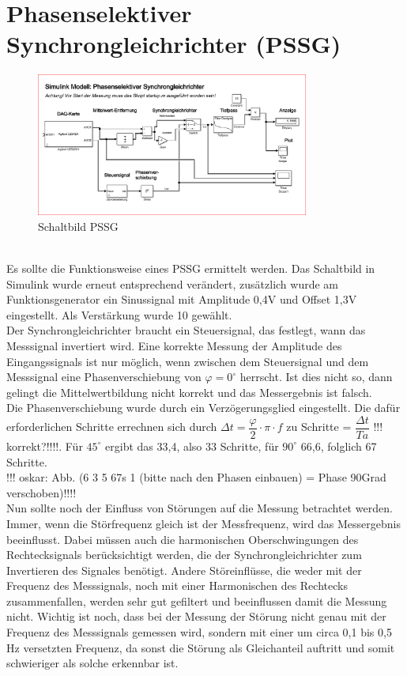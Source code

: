\section{Phasenselektiver Synchrongleichrichter (PSSG)}

\begin{figure}[h]
	\centering
	\includegraphics[width=0.8\textwidth]{./img/ch6/6_3_5}
	\caption{Schaltbild PSSG}
	\label{fg:schalt_pssg}
\end{figure}
~\\
Es sollte die Funktionsweise eines PSSG ermittelt werden. Das Schaltbild in Simulink wurde erneut entsprechend verändert, zusätzlich wurde am Funktionsgenerator ein Sinussignal mit Amplitude 0,4V und Offset 1,3V eingestellt. Als Verstärkung wurde 10 gewählt.
~\\
Der Synchrongleichrichter braucht ein Steuersignal, das festlegt, wann das Messsignal invertiert wird. Eine korrekte Messung der Amplitude des Eingangssignals ist nur möglich, wenn zwischen dem Steuersignal und dem Messsignal eine Phasenverschiebung von $\varphi= 0^\circ $ herrscht. Ist dies nicht so, dann gelingt die Mittelwertbildung nicht korrekt und das Messergebnis ist falsch.
~\\
Die Phasenverschiebung wurde durch ein Verzögerungsglied eingestellt. Die dafür erforderlichen Schritte errechnen sich durch $\Delta t = \dfrac{\varphi}{2} \cdot \pi \cdot f$ zu Schritte = $\dfrac{\Delta t}{Ta}$ !!! korrekt?!!!!. Für $45^\circ$  ergibt das 33,4, also 33 Schritte, für $90^\circ$  66,6, folglich 67 Schritte.
~\\
!!! oskar: Abb. (6 3 5 67s 1 (bitte nach den Phasen einbauen) = Phase 90Grad verschoben)!!!!
~\\
Nun sollte noch der Einfluss von Störungen auf die Messung betrachtet werden. Immer, wenn die Störfrequenz gleich ist der Messfrequenz, wird das Messergebnis beeinflusst. Dabei müssen auch die harmonischen Oberschwingungen des Rechtecksignals berücksichtigt werden, die der Synchrongleichrichter zum Invertieren des Signales benötigt. Andere Störeinflüsse, die weder mit der Frequenz des Messsignals, noch mit einer Harmonischen des Rechtecks zusammenfallen, werden sehr gut gefiltert und beeinflussen damit die Messung nicht. Wichtig ist noch, dass bei der Messung der Störung nicht genau mit der Frequenz des Messsignals gemessen wird, sondern mit einer um circa 0,1 bis 0,5 Hz versetzten Frequenz, da sonst die Störung als Gleichanteil auftritt und somit schwieriger als solche erkennbar ist.
